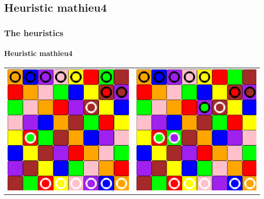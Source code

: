 \documentclass[a4paper, 11pt]{beamer}
\begin{document}
\subsection{Heuristic mathieu4}
\begin{frame}
 \frametitle{The heuristics}
 \framesubtitle{Heuristic mathieu4}
 
 \begin{table}[htbp]
  \centering
  \begin{tabular}{c c}
    \includegraphics[scale = 0.11]{mathieu4_1.png} & \includegraphics[scale = 0.11]{mathieu4_2.png} \\

\end{tabular}
\end{table}
\end{frame}
\end{document}
